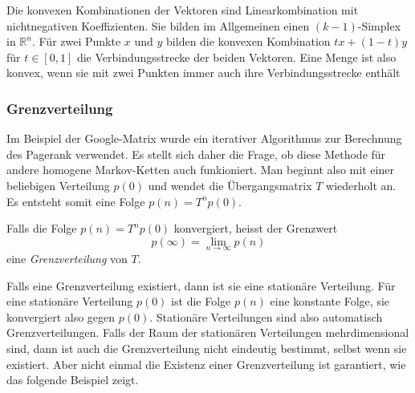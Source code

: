 Die konvexen Kombinationen der Vektoren sind Linearkombination
mit nichtnegativen Koeffizienten. Sie bilden im Allgemeinen
einen $(k-1)$-Simplex in $\mathbb{R}^n$.
Für zwei Punkte $x$ und $y$ bilden die konvexen Kombination
$tx+(1-t)y$ für $t\in[0,1]$ die Verbindungsstrecke der beiden
Vektoren.
Eine Menge ist also konvex, wenn sie mit zwei Punkten immer auch
ihre Verbindungsstrecke enthält



\subsubsection{Grenzverteilung}
Im Beispiel der Google-Matrix wurde ein iterativer Algorithmus
zur Berechnung des Pagerank verwendet.
Es stellt sich daher die Frage, ob diese Methode für andere homogene
Markov-Ketten auch funkioniert.
Man beginnt also mit einer beliebigen Verteilung $p(0)$ und wendet
die Übergangsmatrix $T$ wiederholt an.
Es entsteht somit eine Folge $p(n) = T^np(0)$.

\begin{definition}
Falls die Folge $p(n) = T^np(0)$ konvergiert, heisst der Grenzwert
\[
p(\infty) = \lim_{n\to\infty} p(n)
\]
eine {\em Grenzverteilung} von $T$.
%
\end{definition}

Falls eine Grenzverteilung existiert, dann ist sie eine stationäre
Verteilung.
Für eine stationäre Verteilung $p(0)$ ist die Folge $p(n)$ eine
konstante Folge, sie konvergiert also gegen $p(0)$.
Stationäre Verteilungen sind also automatisch Grenzverteilungen.
Falls der Raum der stationären Verteilungen mehrdimensional sind,
dann ist auch die Grenzverteilung nicht eindeutig bestimmt, selbst
wenn sie existiert.
Aber nicht einmal die Existenz einer Grenzverteilung ist garantiert,
wie das folgende Beispiel zeigt.

